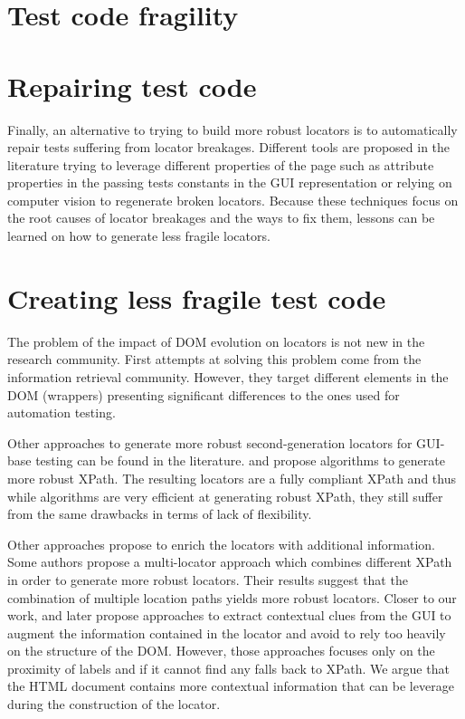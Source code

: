 \section{Test code fragility}

\section{Repairing test code}

Finally, an alternative to trying to build more robust locators is to automatically repair tests suffering from locator breakages. Different tools are proposed in the literature trying to leverage different properties of the page such as attribute properties in the passing tests\cite{Choudhary2011} constants in the GUI representation\cite{Kirinuki2019} or relying on computer vision\cite{Stocco2018} to regenerate broken locators. Because these techniques focus on the root causes of locator breakages and the ways to fix them, lessons can be learned on how to generate less fragile locators.

\section{Creating less fragile test code}

The problem of the impact of DOM evolution on locators is not new in the research community. First attempts at solving this problem come from the information retrieval community\cite{Anton2005, Dalvi2009, Cohen2015}. However, they target different elements in the DOM (wrappers) presenting significant differences to the ones used for automation testing.

Other approaches to generate more robust second-generation locators for GUI-base testing can be found in the literature. \citep{Leotta2014, Leotta2016} and \citep{Montoto2011} propose algorithms to generate more robust XPath. The resulting locators are a fully compliant XPath and thus while algorithms are very efficient at generating robust XPath, they still suffer from the same drawbacks in terms of lack of flexibility. 

Other approaches propose to enrich the locators with additional information. Some authors\cite{Leotta2015, Zheng2018} propose a multi-locator approach which combines different XPath in order to generate more robust locators. Their results suggest that the combination of multiple location paths yields more robust locators. Closer to our work, \citep{Thummalapenta2013} and later \citep{Yandrapally2014} propose approaches to extract contextual clues from the GUI to augment the information contained in the locator and avoid to rely too heavily on the structure of the DOM. However, those approaches focuses only on the proximity of labels and if it cannot find any falls back to XPath. We argue that the HTML document contains more contextual information that can be leverage during the construction of the locator.